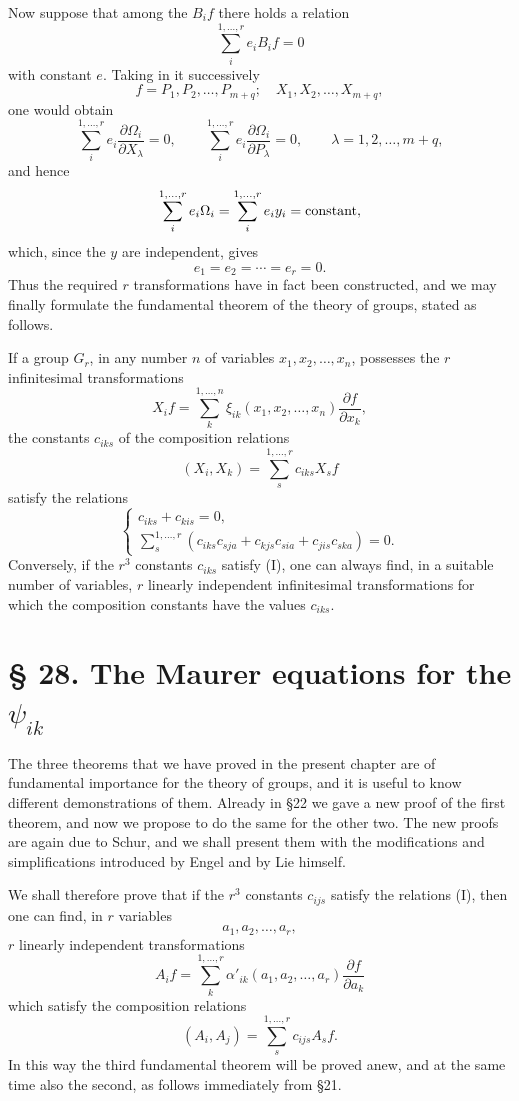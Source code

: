 \documentclass[11pt]{book}
\begin{document}
Now suppose that among the $B_if$ there holds a relation
\[
 \sum\limits_i^{1,\ldots,r} e_iB_i f=0
\]
with constant $e$. Taking in it successively
\[
 f=P_1,P_2,\ldots,P_{m+q};\quad X_1,X_2,\ldots,X_{m+q},
\]
one would obtain
\[
 \sum\limits_i^{1,\ldots,r} e_i\frac{\partial\Omega_i}{\partial X_\lambda}=0,
 \qquad
 \sum\limits_i^{1,\ldots,r} e_i\frac{\partial\Omega_i}{\partial P_\lambda}=0,
 \qquad \lambda=1,2,\ldots,m+q,
\]
and hence
\[
 \sum\limits_i^{1,\ldots,r} e_i\Omega_i=\sum\limits_i^{1,\ldots,r} e_iy_i=\hbox{constant},
\]
which, since the $y$ are independent, gives
\[
 e_1=e_2=\cdots=e_r=0.
\]
Thus the required $r$ transformations have in fact been constructed, and we may finally formulate the fundamental theorem of the theory of groups, stated as follows.

If a group $G_r$, in any number $n$ of variables $x_1,x_2,\ldots,x_n$, possesses the $r$ infinitesimal transformations
\[
 X_i f=\sum\limits_k^{1,\ldots,n}\xi_{ik}(x_1,x_2,\ldots,x_n)\frac{\partial f}{\partial x_k},
\]
the constants $c_{iks}$ of the composition relations
\[
 (X_i,X_k)=\sum\limits_s^{1,\ldots,r} c_{iks}X_s f
\]
satisfy the relations
\[
\left\{
\begin{array}{l}
 c_{iks}+c_{kis}=0,\\[0.4em]
 \displaystyle\sum\limits_s^{1,\ldots,r}
 \left(c_{iks}c_{sja}+c_{kjs}c_{sia}+c_{jis}c_{ska}\right)=0.
\end{array}
\right.
\tag{I}
\]
Conversely, if the $r^3$ constants $c_{iks}$ satisfy (I), one can always find, in a suitable number of variables, $r$ linearly independent infinitesimal transformations for which the composition constants have the values $c_{iks}$.

\section*{\S{} 28. The Maurer equations for the $\psi_{ik}$}

The three theorems that we have proved in the present chapter are of fundamental importance for the theory of groups, and it is useful to know different demonstrations of them. Already in \S{}22 we gave a new proof of the first theorem, and now we propose to do the same for the other two. The new proofs are again due to Schur, and we shall present them with the modifications and simplifications introduced by Engel and by Lie himself.

We shall therefore prove that if the $r^3$ constants $c_{ijs}$ satisfy the relations (I), then one can find, in $r$ variables
\[
 a_1,a_2,\ldots,a_r,
\]
$r$ linearly independent transformations
\begin{equation*}\tag{19}
 A_i f=\sum\limits_k^{1,\ldots,r}\alpha'_{ik}(a_1,a_2,\ldots,a_r)
        \frac{\partial f}{\partial a_k}
\end{equation*}
which satisfy the composition relations
\begin{equation*}\tag{20}
 (A_i,A_j)=\sum\limits_s^{1,\ldots,r}c_{ijs}A_sf.
\end{equation*}
In this way the third fundamental theorem will be proved anew, and at the same time also the second, as follows immediately from \S{}21.
\end{document}
